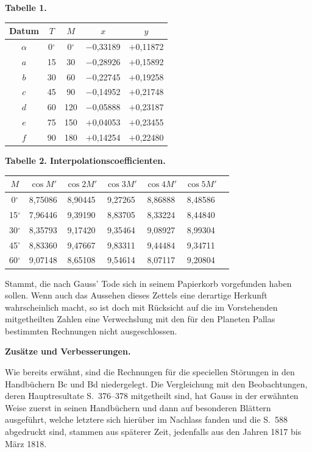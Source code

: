 \documentclass[10pt,a4paper]{article}
\begin{document}
\newpage
\noindent\textbf{Tabelle 1.}

\smallskip
\begin{center}
\begin{tabular}{|c|c|c|c|c|}
\hline
Datum & $T$ & $M$ & $x$ & $y$ \\
\hline
$\alpha$ & 0$^\circ$ & 0$^\circ$ & $-$0,33189 & $+$0,11872 \\
$a$ & 15 & 30 & $-$0,28926 & $+$0,15892 \\
$b$ & 30 & 60 & $-$0,22745 & $+$0,19258 \\
$c$ & 45 & 90 & $-$0,14952 & $+$0,21748 \\
$d$ & 60 & 120 & $-$0,05888 & $+$0,23187 \\
$e$ & 75 & 150 & $+$0,04053 & $+$0,23455 \\
$f$ & 90 & 180 & $+$0,14254 & $+$0,22480 \\
\hline
\end{tabular}
\end{center}

\newpage
\noindent\textbf{Tabelle 2. Interpolationscoefficienten.}

\smallskip
\begin{center}
\begin{tabular}{|c|c|c|c|c|c|c|}
\hline
$M$ & $\cos M'$ & $\cos 2M'$ & $\cos 3M'$ & $\cos 4M'$ & $\cos 5M'$ \\
\hline
0$^\circ$ & 8,75086 & 8,90445 & 9,27265 & 8,86888 & 8,48586 \\
15$^\circ$ & 7,96446 & 9,39190 & 8,83705 & 8,33224 & 8,44840 \\
30$^\circ$ & 8,35793 & 9,17420 & 9,35464 & 9,08927 & 8,99304 \\
45$^\circ$ & 8,83360 & 9,47667 & 9,83311 & 9,44484 & 9,34711 \\
60$^\circ$ & 9,07148 & 8,65108 & 9,54614 & 8,07117 & 9,20804 \\
\hline
\end{tabular}
\end{center}

\newpage
\noindent
Stammt, die nach Gauss' Tode sich in seinem Papierkorb vorgefunden haben sollen. Wenn auch das Aussehen dieses Zettels eine derartige Herkunft wahrscheinlich macht, so ist doch mit R\"ucksicht auf die im Vorstehenden mitgetheilten Zahlen eine Verwechslung mit den f\"ur den Planeten Pallas bestimmten Rechnungen nicht ausgeschlossen.

\medskip
\noindent\textbf{Zus\"atze und Verbesserungen.}

\medskip
\noindent
Wie bereits erw\"ahnt, sind die Rechnungen f\"ur die speciellen St\"orungen in den Handb\"uchern Bc und Bd niedergelegt. Die Vergleichung mit den Beobachtungen, deren Hauptresultate S.~376--378 mitgetheilt sind, hat Gauss in der erw\"ahnten Weise zuerst in seinen Handb\"uchern und dann auf besonderen Bl\"attern ausgef\"uhrt, welche letztere sich hier\"uber im Nachlass fanden und die S.~588 abgedruckt sind, stammen aus sp\"aterer Zeit, jedenfalls aus den Jahren 1817 bis M\"arz 1818.
\end{document}
